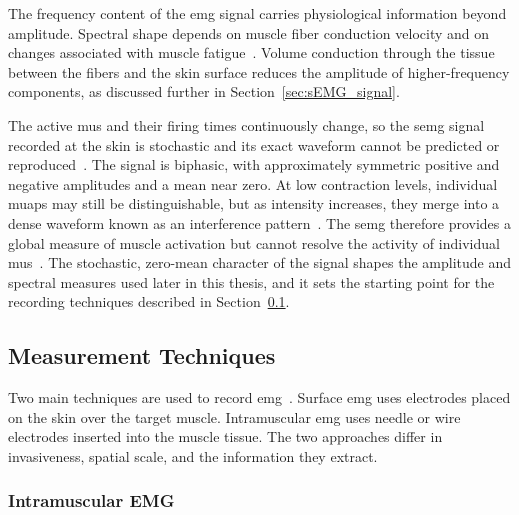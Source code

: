 The frequency content of the \gls{emg} signal carries physiological information beyond amplitude. Spectral shape depends on muscle fiber conduction velocity and on changes associated with muscle fatigue~\cite{kamen_essentials_2010, cavalcanti_garcia_surface_2010}. Volume conduction through the tissue between the fibers and the skin surface reduces the amplitude of higher-frequency components, as discussed further in Section~\ref{sec:sEMG_signal}.

The active \glspl{mu} and their firing times continuously change, so the \gls{semg} signal recorded at the skin is stochastic and its exact waveform cannot be predicted or reproduced~\cite{konrad_abc_2006}. The signal is biphasic, with approximately symmetric positive and negative amplitudes and a mean near zero. At low contraction levels, individual \glspl{muap} may still be distinguishable, but as intensity increases, they merge into a dense waveform known as an interference pattern~\cite{konrad_abc_2006, cavalcanti_garcia_surface_2010}. The \gls{semg} therefore provides a global measure of muscle activation but cannot resolve the activity of individual \glspl{mu}~\cite{cavalcanti_garcia_surface_2010}. The stochastic, zero-mean character of the signal shapes the amplitude and spectral measures used later in this thesis, and it sets the starting point for the recording techniques described in Section~\ref{sec:EMG_measurement}.

\FloatBarrier

\subsection{Measurement Techniques} \label{sec:EMG_measurement}
Two main techniques are used to record \gls{emg}~\cite{kamen_essentials_2010}. Surface \gls{emg} uses electrodes placed on the skin over the target muscle. Intramuscular \gls{emg} uses needle or wire electrodes inserted into the muscle tissue. The two approaches differ in invasiveness, spatial scale, and the information they extract.

\subsubsection{Intramuscular EMG} \label{sec:Intra_EMG}

